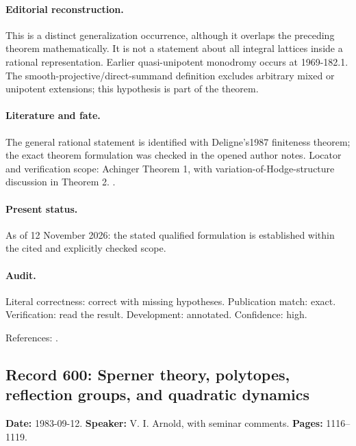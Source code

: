 \paragraph{Editorial reconstruction.} This is a distinct generalization occurrence, although it overlaps the preceding theorem mathematically. It is not a statement about all integral lattices inside a rational representation. Earlier quasi-unipotent monodromy occurs at 1969-182.1. The smooth-projective/direct-summand definition excludes arbitrary mixed or unipotent extensions; this hypothesis is part of the theorem.

\paragraph{Literature and fate.} The general rational statement is identified with Deligne's1987 finiteness theorem; the exact theorem formulation was checked in the opened author notes. Locator and verification scope: Achinger Theorem 1, with variation-of-Hodge-structure discussion in Theorem 2. \cite{deligne1987finitude,achinger2018monodromy}.

\paragraph{Present status.} As of 12 November 2026: the stated qualified formulation is established within the cited and explicitly checked scope.

\paragraph{Audit.} Literal correctness: correct with missing hypotheses. Publication match: exact. Verification: read the result. Development: annotated. Confidence: high.

\noindent References: \citep{deligne1987finitude,achinger2018monodromy}.\par

\subsection{Record 600: Sperner theory, polytopes, reflection groups, and quadratic dynamics}

\label{talk:600}

\noindent\textbf{Date:} 1983-09-12. \textbf{Speaker:} V. I. Arnold, with seminar comments. \textbf{Pages:} 1116--1119.\par


